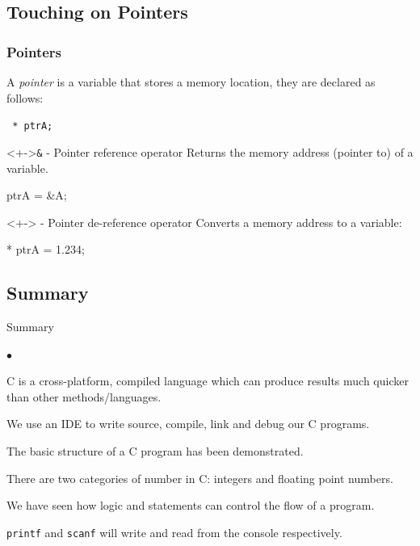 \documentclass[smaller,handout,table]{beamer}
\begin{document}
\subsection{Touching on Pointers}
\begin{frame}[fragile]
\frametitle{Pointers}
A \emph{pointer} is a variable that stores a memory location, they are declared as follows:
\begin{center}
\tt {} * ptrA;
\end{center}

\begin{block}<+->{{\tt \&} - Pointer reference operator}
Returns the memory address (pointer to) of a variable.
\begin{semiverbatim}
   ptrA = \&A;   
\end{semiverbatim}
\end{block}

\begin{block}<+->{{\tt *} - Pointer de-reference operator}
Converts a memory address to a variable:
\begin{semiverbatim}
   * ptrA  = 1.234;      
\end{semiverbatim}
\end{block}
\end{frame}

\subsection{Summary}
\begin{frame}{Summary}
\begin{list}{$\bullet$}{}
\item C is a cross-platform, compiled language which can produce results much quicker than other methods/languages.
\item We use an IDE to write source, compile, link and debug our C programs.
\item The basic structure of a C program has been demonstrated.
\item There are two categories of number in C: integers and floating point numbers.
\item We have seen how logic and statements can control the flow of a program.
\item \texttt{printf} and \texttt{scanf} will write and read from the console respectively.
\end{list}
\end{frame}
\end{document}
